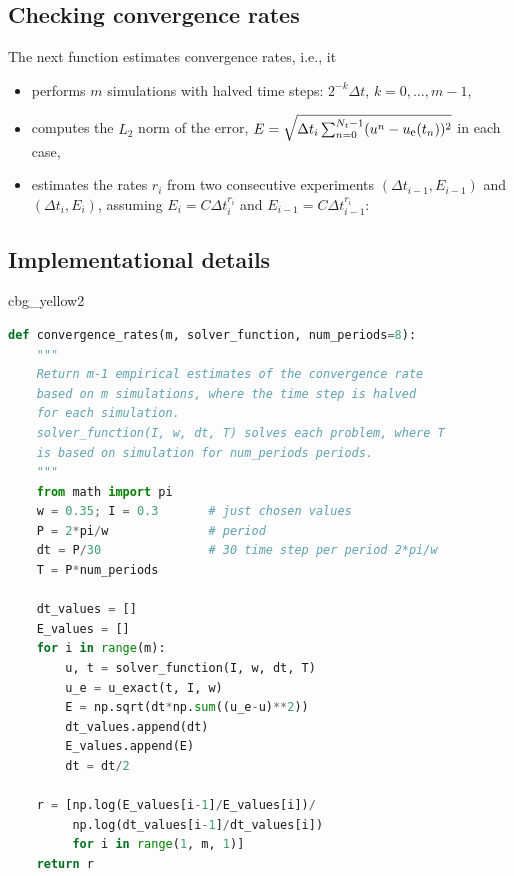 \documentclass[%
oneside,                 %
final,                   %
10pt]{article}
\newenvironment{_cod_tight}[1]{
   \def\FrameCommand{\colorbox{#1}}
   \FrameRule0.6pt\MakeFramed {\FrameRestore}\vskip3mm}
   {\vskip0mm\endMakeFramed}
\newenvironment{cod}[1]{
\bgroup\rmfamily
\fboxsep=0mm\relax
\begin{_cod_tight}{#1}
\list{}{\parsep=-2mm\parskip=0mm\topsep=0pt\leftmargin=2mm
\rightmargin=2\leftmargin\leftmargin=4pt\relax}
\item\relax}
{\endlist\end{_cod_tight}\egroup}
\begin{document}
\noindent
\subsection*{Checking convergence rates}

The next function estimates convergence rates, i.e., it

\begin{itemize}
 \item performs $m$ simulations with halved time steps: $2^{-k}\Delta t$, $k=0,\ldots,m-1$,

 \item computes the $L_2$ norm of the error,
   $E = \sqrt{\Delta t_i\sum_{n=0}^{N_t-1}(u^n-\uex(t_n))^2}$ in each case,

 \item estimates the rates $r_i$ from two consecutive
   experiments $(\Delta t_{i-1}, E_{i-1})$ and $(\Delta t_{i}, E_{i})$,
   assuming $E_i=C\Delta t_i^{r_i}$ and $E_{i-1}=C\Delta t_{i-1}^{r_i}$:
\end{itemize}

\noindent
\subsection*{Implementational details}

\begin{cod}{cbg_yellow2}\begin{lstlisting}[language=Python,style=simple,xleftmargin=2mm]
def convergence_rates(m, solver_function, num_periods=8):
    """
    Return m-1 empirical estimates of the convergence rate
    based on m simulations, where the time step is halved
    for each simulation.
    solver_function(I, w, dt, T) solves each problem, where T
    is based on simulation for num_periods periods.
    """
    from math import pi
    w = 0.35; I = 0.3       # just chosen values
    P = 2*pi/w              # period
    dt = P/30               # 30 time step per period 2*pi/w
    T = P*num_periods

    dt_values = []
    E_values = []
    for i in range(m):
        u, t = solver_function(I, w, dt, T)
        u_e = u_exact(t, I, w)
        E = np.sqrt(dt*np.sum((u_e-u)**2))
        dt_values.append(dt)
        E_values.append(E)
        dt = dt/2

    r = [np.log(E_values[i-1]/E_values[i])/
         np.log(dt_values[i-1]/dt_values[i])
         for i in range(1, m, 1)]
    return r
\end{lstlisting}\end{cod}
\noindent
\end{document}
